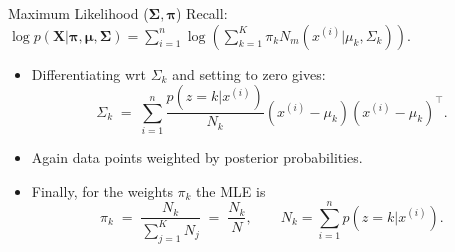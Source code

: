 \documentclass[11pt,handout,aspectratio=169]{beamer}
\begin{document}


\begin{frame}{Maximum Likelihood ($\boldsymbol \Sigma,\boldsymbol \pi$)}
Recall: $\log p(\boldsymbol X|\boldsymbol\pi,\boldsymbol\mu,\boldsymbol\Sigma)=\sum_{i=1}^n\log\left(\sum_{k=1}^K\pi_k N_m(x^{(i)}|\mu_k,\Sigma_k)\right)$.
\begin{itemize}
	\item Differentiating wrt $\Sigma_k$ and setting to zero gives:
	$$\Sigma_k\;=\;\sum_{i=1}^n \frac{p(z=k|x^{(i)})}{N_k}(x^{(i)}-\mu_k)(x^{(i)}-\mu_k)^\top.$$
	\item Again data points weighted by posterior probabilities.\\[.4cm]
	\item Finally, for the weights $\pi_k$ the MLE is
$$
\pi_k\;=\;\frac{N_k}{\sum_{j=1}^K N_j}\;=\;\frac{N_k}{N},\qquad N_k=\sum_{i=1}^n p(z=k|x^{(i)}).
$$
\end{itemize}
\end{frame}



\end{document}
